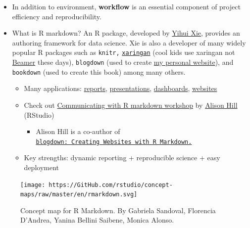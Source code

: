 \documentclass[
  letterpaper,
  DIV=11,
  numbers=noendperiod]{scrreprt}
\providecommand{\tightlist}{%
  \setlength{\itemsep}{0pt}\setlength{\parskip}{0pt}}\usepackage{longtable,booktabs,array}
\begin{document}
\begin{itemize}
\item
  In addition to environment, \textbf{workflow} is an essential
  component of project efficiency and reproducibility.
\item
  What is R markdown? An R package, developed by
  \href{https://yihui.org/en/}{Yihui Xie}, provides an authoring
  framework for data science. Xie is also a developer of many widely
  popular R packages such as \texttt{knitr,}
  \href{https://GitHub.com/yihui/xaringan}{\texttt{xaringan}} (cool kids
  use xaringan not
  \href{https://en.wikipedia.org/wiki/Beamer_(LaTeX)}{Beamer} these
  days), \texttt{blogdown} (used to create
  \href{https://jaeyk.GitHub.io/}{my personal website}), and
  \texttt{bookdown} (used to create this book) among many others.

  \begin{itemize}
  \tightlist
  \item
    Many applications:
    \href{https://rstudio.GitHub.io/distill/basics.html}{reports},
    \href{https://bookdown.org/yihui/rmarkdown/xaringan.html}{presentations},
    \href{https://rmarkdown.rstudio.com/flexdashboard/}{dashboards},
    \href{https://bookdown.org/yihui/rmarkdown/websites.html}{websites}\\
  \item
    Check out \href{https://ysc-rmarkdown.netlify.app/}{Communicating
    with R markdown workshop} by \href{https://alison.rbind.io/}{Alison
    Hill} (RStudio)

    \begin{itemize}
    \tightlist
    \item
      Alison Hill is a co-author of
      \href{https://bookdown.org/yihui/blogdown/}{\texttt{blogdown:\ Creating\ Websites\ with\ R\ Markdown.}}
    \end{itemize}
  \item
    Key strengths: dynamic reporting + reproducible science + easy
    deployment
  \end{itemize}
\end{itemize}

\begin{figure}

{\centering \texttt{[image: https://GitHub.com/rstudio/concept-maps/raw/master/en/rmarkdown.svg]}

}

\caption{Concept map for R Markdown. By Gabriela Sandoval, Florencia
D'Andrea, Yanina Bellini Saibene, Monica Alonso.}

\end{figure}
\end{document}
